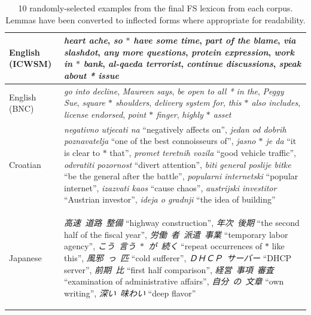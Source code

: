 \documentclass[11pt,letterpaper]{article}
\newcommand{\gap}{$*$\xspace}
\newcommand{\ex}[1]{\textit{#1}\xspace}
\newcommand{\gl}[1]{``#1''\xspace}
\begin{document}
\begin{table}[!t]
 
 \begin{center}
 \begin{tabular}{p{1.5cm}p{14cm}}
\toprule
English (ICWSM) & \ex{heart ache}, \ex{so \gap have some time}, \ex{part of the blame}, \ex{via slashdot}, \ex{any more questions}, \ex{protein expression}, \ex{work in \gap bank}, \ex{al-qaeda terrorist}, \ex{continue discussions}, \ex{speak about * issue}\\
\midrule
English (BNC) & \ex{go into decline}, \ex{Maureen says}, \ex{be open to all * in the}, \ex{Peggy Sue}, \ex{square \gap shoulders}, \ex{delivery system for}, \ex{this \gap also includes}, \ex{license endorsed}, \ex{point \gap finger}, \ex{highly \gap asset}\\
\midrule
Croatian & \ex{negativno utjecati na} \gl{negatively affects on},
\ex{jedan od dobrih poznavatelja} \gl{one of the best connoisseurs of}, \ex{jasno \gap je da} \gl{it is clear to \gap that}, \ex{promet teretnih vozila} \gl{good vehicle traffic}, \ex{odvratiti pozornost} \gl{divert attention}, \ex{biti general poslije bitke} \gl{be the general after the battle}, \ex{popularni internetski} \gl{popular internet}, \ex{izazvati kaos} \gl{cause chaos}, \ex{austrijski investitor} \gl{Austrian investor}, \ex{ideja o gradnji} \gl{the idea of building} \\
\midrule
Japanese & \begin{CJK*}{UTF8}{min} \ex{高速\ 道路\ 整備} \gl{highway construction}, \ex{年次\ 後期} \gl{the second half of the fiscal year}, \ex{労働\ 者\ 派遣\ 事業} \gl{temporary labor agency}, \ex{こう\ 言う\ \gap\ が\ 続く} \gl{repeat occurrences of \gap like this},  \ex{風邪\ っ\ 匹} \gl{cold sufferer}, \ex{ＤＨＣＰ\ サーバー} \gl{DHCP server}, \ex{前期\ 比} \gl{first half comparison}, \ex{経営\ 事項\ 審査 } \gl{examination of administrative affairs}, \ex{自分\ の\ 文章} \gl{own writing}, \ex{深い\ 味わい} \gl{deep flavor} \end{CJK*} \\
\bottomrule
\end{tabular}
  \caption{10 randomly-selected examples from the final FS lexicon from each corpus. Lemmas have been converted to inflected forms where appropriate for readability.}
	 \label{tab:sample}

 \end{center}

\end{table}
\end{document}
